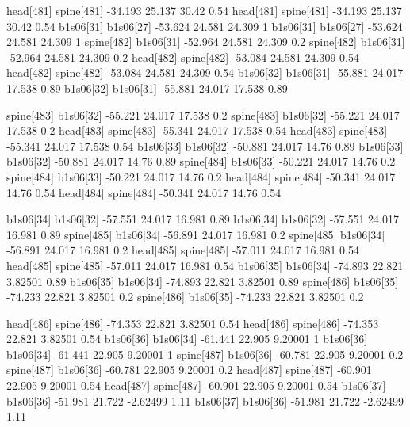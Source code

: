 head[481]    spine[481]    -34.193    25.137    30.42    0.54
head[481]    spine[481]    -34.193    25.137    30.42    0.54
b1s06[31]    b1s06[27]    -53.624    24.581    24.309    1
b1s06[31]    b1s06[27]    -53.624    24.581    24.309    1
spine[482]    b1s06[31]    -52.964    24.581    24.309    0.2
spine[482]    b1s06[31]    -52.964    24.581    24.309    0.2
head[482]    spine[482]    -53.084    24.581    24.309    0.54
head[482]    spine[482]    -53.084    24.581    24.309    0.54
b1s06[32]    b1s06[31]    -55.881    24.017    17.538    0.89
b1s06[32]    b1s06[31]    -55.881    24.017    17.538    0.89


spine[483]    b1s06[32]    -55.221    24.017    17.538    0.2
spine[483]    b1s06[32]    -55.221    24.017    17.538    0.2
head[483]    spine[483]    -55.341    24.017    17.538    0.54
head[483]    spine[483]    -55.341    24.017    17.538    0.54
b1s06[33]    b1s06[32]    -50.881    24.017    14.76    0.89
b1s06[33]    b1s06[32]    -50.881    24.017    14.76    0.89
spine[484]    b1s06[33]    -50.221    24.017    14.76    0.2
spine[484]    b1s06[33]    -50.221    24.017    14.76    0.2
head[484]    spine[484]    -50.341    24.017    14.76    0.54
head[484]    spine[484]    -50.341    24.017    14.76    0.54


b1s06[34]    b1s06[32]    -57.551    24.017    16.981    0.89
b1s06[34]    b1s06[32]    -57.551    24.017    16.981    0.89
spine[485]    b1s06[34]    -56.891    24.017    16.981    0.2
spine[485]    b1s06[34]    -56.891    24.017    16.981    0.2
head[485]    spine[485]    -57.011    24.017    16.981    0.54
head[485]    spine[485]    -57.011    24.017    16.981    0.54
b1s06[35]    b1s06[34]    -74.893    22.821    3.82501    0.89
b1s06[35]    b1s06[34]    -74.893    22.821    3.82501    0.89
spine[486]    b1s06[35]    -74.233    22.821    3.82501    0.2
spine[486]    b1s06[35]    -74.233    22.821    3.82501    0.2


head[486]    spine[486]    -74.353    22.821    3.82501    0.54
head[486]    spine[486]    -74.353    22.821    3.82501    0.54
b1s06[36]    b1s06[34]    -61.441    22.905    9.20001    1
b1s06[36]    b1s06[34]    -61.441    22.905    9.20001    1
spine[487]    b1s06[36]    -60.781    22.905    9.20001    0.2
spine[487]    b1s06[36]    -60.781    22.905    9.20001    0.2
head[487]    spine[487]    -60.901    22.905    9.20001    0.54
head[487]    spine[487]    -60.901    22.905    9.20001    0.54
b1s06[37]    b1s06[36]    -51.981    21.722    -2.62499    1.11
b1s06[37]    b1s06[36]    -51.981    21.722    -2.62499    1.11


